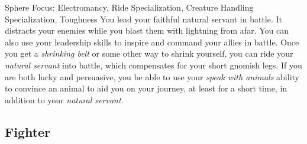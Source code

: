              Sphere Focus: Electromancy, Ride Specialization, Creature Handling Specialization, Toughness
             You lead your faithful natural servant in battle.
            It distracts your enemies while you blast them with lightning from afar.
            You can also use your leadership skills to inspire and command your allies in battle.
            Once you get a \textit{shrinking belt} or some other way to shrink yourself, you can ride your \textit{natural servant} into battle, which compensates for your short gnomish legs.
            If you are both lucky and persuasive, you be able to use your \textit{speak with animals} ability to convince an animal to aid you on your journey, at least for a short time, in addition to your \textit{natural servant}.

    \subsection{Fighter}

